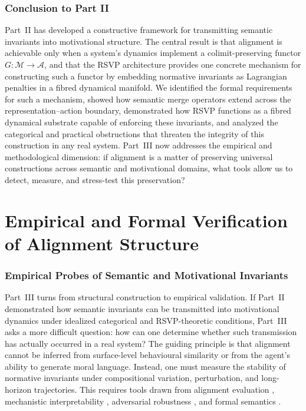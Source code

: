 \documentclass[12pt]{article}
\theoremstyle{definition}
\begin{document}
\section{Conclusion to Part II}

Part~II has developed a constructive framework for transmitting semantic
invariants into motivational structure. The central result is that alignment is
achievable only when a system's dynamics implement a colimit-preserving functor
$G : \mathcal{M} \to \mathcal{A}$, and that the RSVP architecture provides one
concrete mechanism for constructing such a functor by embedding normative
invariants as Lagrangian penalties in a fibred dynamical manifold. We identified
the formal requirements for such a mechanism, showed how semantic merge
operators extend across the representation--action boundary, demonstrated how
RSVP functions as a fibred dynamical substrate capable of enforcing these
invariants, and analyzed the categorical and practical obstructions that
threaten the integrity of this construction in any real system. Part~III now
addresses the empirical and methodological dimension: if alignment is a matter
of preserving universal constructions across semantic and motivational domains,
what tools allow us to detect, measure, and stress-test this preservation?


\part{Empirical and Formal Verification of Alignment Structure}

\section{Empirical Probes of Semantic and Motivational Invariants}

Part~III turns from structural construction to empirical validation. If Part~II
demonstrated how semantic invariants can be transmitted into motivational
dynamics under idealized categorical and RSVP-theoretic conditions, Part~III
asks a more difficult question: how can one determine whether such transmission
has actually occurred in a real system? The guiding principle is that alignment
cannot be inferred from surface-level behavioural similarity or from the agent's
ability to generate moral language. Instead, one must measure the stability of
normative invariants under compositional variation, perturbation, and
long-horizon trajectories. This requires tools drawn from alignment evaluation
\citep{ngo2022evals}, mechanistic interpretability \citep{olah2020,elhage2022},
adversarial robustness \citep{ilyas2019}, and formal semantics
\citep{spivak2014,jacobs2012}.
\end{document}
